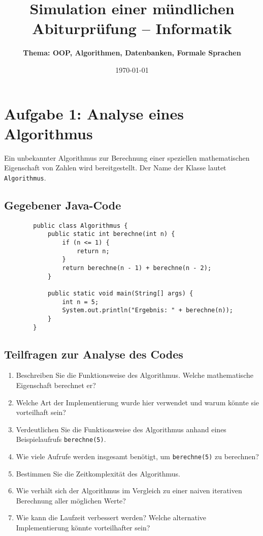 \documentclass[a4paper,12pt]{article}
\begin{document}
	
	\title{\textbf{Simulation einer mündlichen Abiturprüfung -- Informatik}}
	\author{\textbf{Thema: OOP, Algorithmen, Datenbanken, Formale Sprachen}}
	\date{\today}
	\maketitle
	
	\section*{Aufgabe 1: Analyse eines Algorithmus}
	
	Ein unbekannter Algorithmus zur Berechnung einer speziellen mathematischen Eigenschaft von Zahlen wird bereitgestellt. Der Name der Klasse lautet \texttt{Algorithmus}.
	
	\subsection*{Gegebener Java-Code}
	
	\begin{verbatim}
		public class Algorithmus {
			public static int berechne(int n) {
				if (n <= 1) {
					return n;
				}
				return berechne(n - 1) + berechne(n - 2);
			}
			
			public static void main(String[] args) {
				int n = 5;
				System.out.println("Ergebnis: " + berechne(n));
			}
		}
	\end{verbatim}
	
	\subsection*{Teilfragen zur Analyse des Codes}
	
	\begin{enumerate}
		\item Beschreiben Sie die Funktionsweise des Algorithmus. Welche mathematische Eigenschaft berechnet er?		
		\item Welche Art der Implementierung wurde hier verwendet und warum könnte sie vorteilhaft sein?
		\item Verdeutlichen Sie die Funktionsweise des Algorithmus anhand eines Beispielaufrufs \texttt{berechne(5)}.
		\item Wie viele Aufrufe werden insgesamt benötigt, um \texttt{berechne(5)} zu berechnen?
		\item Bestimmen Sie die Zeitkomplexität des Algorithmus.
		
		\item Wie verhält sich der Algorithmus im Vergleich zu einer naiven iterativen Berechnung aller möglichen Werte?
		
		\item Wie kann die Laufzeit verbessert werden? Welche alternative Implementierung könnte vorteilhafter sein?

	\end{enumerate}
	
\end{document}
